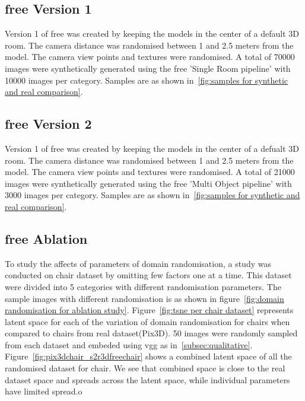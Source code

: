 \subsection{\gls{free} Version 1}
Version 1 of \gls{free} was created by keeping the models in the center of a default 3D room.
The camera distance was randomised between 1 and 2.5 meters from the model.
The camera view points and textures were randomised.
A total of 70000 images were synthetically generated using the \gls{free} 'Single Room pipeline' with 10000 images per category.
Samples are as shown in~\ref{fig:samples for synthetic and real comparison}.

\subsection{\gls{free} Version 2}
Version 1 of \gls{free} was created by keeping the models in the center of a defualt 3D room.
The camera distance was randomised between 1 and 2.5 meters from the model.
The camera view points and textures were randomised.
A total of 21000 images were synthetically generated using the \gls{free} 'Multi Object pipeline' with 3000 images per category.
Samples are as shown in~\ref{fig:samples for synthetic and real comparison}.

\subsection{\gls{free} Ablation}\label{subsec:s2r:3dfree-ablation}
To study the affects of parameters of domain randomisation, a study was conducted on chair dataset by omitting few factors one at a time.
This dataset were divided into 5 categories with different randomisation parameters.
The sample images with different randomisation is as shown in figure~\ref{fig:domain randomisation for ablation study}.
Figure~\ref{fig:tsne per chair dataset} represents latent space for each of the variation of domain randomisation for chairs when compared to chairs from real dataset(Pix3D).
50 images were randomly sampled from each dataset and embeded using \gls{vgg} as in~\ref{subsec:qualitative}.
Figure~\ref{fig:pix3dchair_s2r3dfreechair} shows a combined latent space of all the randomised dataset for chair.
We see that combined space is close to the real dataset space and spreads across the latent space, while individual parameters have limited spread.o


